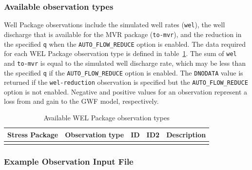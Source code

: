 \vspace{5mm}
\subsubsection{Available observation types}
Well Package observations include the simulated well rates (\texttt{wel}), the well discharge that is available for the MVR package (\texttt{to-mvr}), and the reduction in the specified \texttt{q} when the \texttt{AUTO\_FLOW\_REDUCE} option is enabled. The data required for each WEL Package observation type is defined in table~\ref{table:gwf-welgobstype}. The sum of \texttt{wel} and \texttt{to-mvr} is equal to the simulated well discharge rate, which may be less than the specified \texttt{q} if the \texttt{AUTO\_FLOW\_REDUCE} option is enabled. The \texttt{DNODATA} value is returned if the \texttt{wel-reduction} observation is specified but the \texttt{AUTO\_FLOW\_REDUCE} option is not enabled. Negative and positive values for an observation represent a loss from and gain to the GWF model, respectively.

\begin{longtable}{p{2cm} p{2.75cm} p{2cm} p{1.25cm} p{7cm}}
\caption{Available WEL Package observation types} \tabularnewline

\hline
\hline
\textbf{Stress Package} & \textbf{Observation type} & \textbf{ID} & \textbf{ID2} & \textbf{Description} \\
\hline
\endhead

\hline
\endfoot


\label{table:gwf-welgobstype}
\end{longtable}

\vspace{5mm}
\subsubsection{Example Observation Input File}

